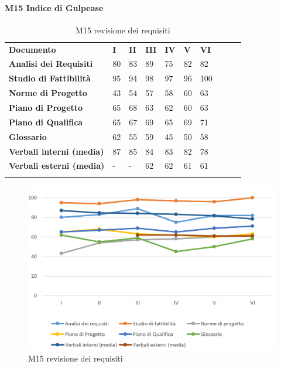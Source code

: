 \paragraph{M15 Indice di Gulpease}\mbox{} %
\begin{longtable} {						
		>{}p{50mm}  		
		>{}p{8mm}		
		>{}p{8mm}		
		>{}p{8mm}		
		>{}p{8mm}		
		>{}p{8mm}		
		>{}p{8mm}
		>{}p{8mm}
		>{}p{8mm}
		>{}p{8mm}				
	}			
	\rowcolor{gray!50}
	\textbf{Documento} & \textbf{I} & \textbf{II} & \textbf{III} & \textbf{IV} & \textbf{V} & \textbf{VI} \TBstrut \\ [2mm]
	\textbf{Analisi dei Requisiti} & 80 & 83 & 89 & 75 & 82 & 82 \TBstrut \\ [2mm]
	\textbf{Studio di Fattibilità} & 95 & 94 & 98 & 97 & 96 & 100 \TBstrut \\ [2mm]
	\textbf{Norme di Progetto} & 43 & 54 & 57 & 58 & 60 & 63 \TBstrut \\ [2mm]
	\textbf{Piano di Progetto} & 65 & 68 & 63 & 62 & 60 & 63 \TBstrut \\ [2mm]
	\textbf{Piano di Qualifica} & 65 & 67 & 69 & 65 & 69 & 71 \TBstrut \\ [2mm]
	\textbf{Glossario} & 62 & 55 & 59 & 45 & 50 & 58 \TBstrut \\ [2mm]
	\textbf{Verbali interni (media)} & 87 & 85 & 84 & 83 & 82 & 78 \TBstrut \\ [2mm]
	\textbf{Verbali esterni (media)} & - & - & 62 & 62 & 61 & 61 \TBstrut \\ [2mm]
	\rowcolor{white}
	\caption{M15 revisione dei requisiti}
\end{longtable}
\begin{figure}[H] 	
	\includegraphics[width=\linewidth]{./img/grafici/2.png}	
	\caption{M15 revisione dei requisiti}	
\end{figure}
